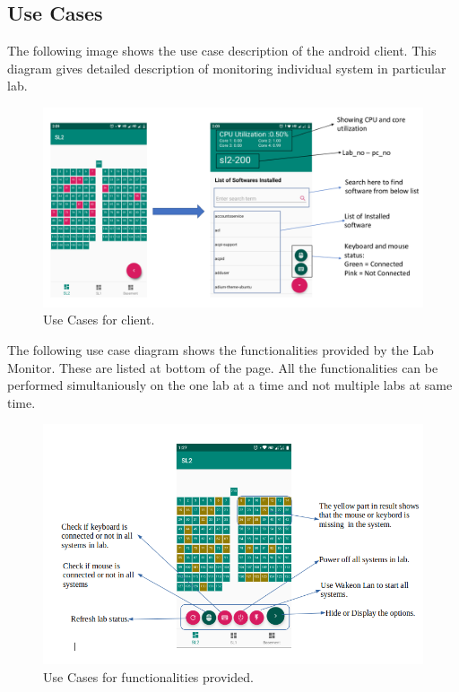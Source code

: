 \documentclass[oneside,a4paper,12pt]{article}
\begin{document}
\subsection{Use Cases}
The following image shows the use case description of the android client. This diagram gives detailed description of monitoring individual system in particular lab.
\begin{figure}[H]
        \centering
        \includegraphics[scale=0.5]{assets/use_cases.png}
        \caption{Use Cases for client.}
\end{figure}
The following use case diagram shows the functionalities provided by the Lab Monitor. These are listed at bottom of the page. All the functionalities can be performed simultaniously on the one lab at a time and not multiple labs at same time.
\begin{figure}[H]
        \centering
        \includegraphics[scale=0.5]{assets/functionality.png}
        \caption{Use Cases for functionalities provided.}
\end{figure}

\newpage
\end{document}
